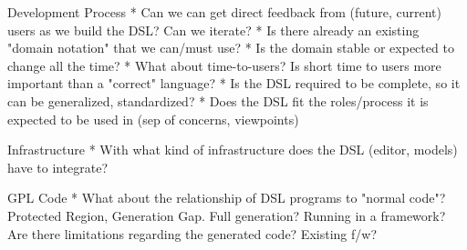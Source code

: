 \documentclass[submission,copyright,creativecommons]{eptcs}
\begin{document}
    Development Process	
    * Can we can get direct feedback from (future, current) users as 
      we build the DSL? Can we iterate? 
    * Is there already an existing "domain notation" that we can/must
      use?
    * Is the domain stable or expected to change all the time?
    * What about time-to-users? Is short time to users more 
      important than a "correct" language?
    * Is the DSL required to be complete, so it can be 
      generalized, standardized?
    * Does the DSL fit the roles/process it is expected to 
      be used in (sep of concerns, viewpoints)
	
	Infrastructure
	* With what kind of infrastructure does the DSL (editor, models)
	  have to integrate?
	  
	GPL Code 
	* What about the relationship of DSL programs to "normal code"?
	  Protected Region, Generation Gap. Full generation? Running
	  in a framework? Are there limitations regarding the generated code?
	  Existing f/w?


\nocite{*}


\end{document}
